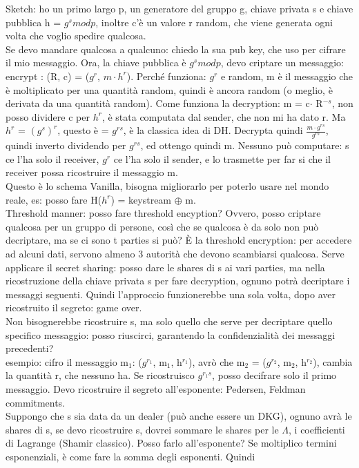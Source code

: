 \documentclass[16px]{article}
\begin{document}
Sketch: ho un primo largo p, un generatore del gruppo g, chiave privata s e chiave pubblica h = $g^smodp$, inoltre c'è un valore r random, che viene generata ogni volta che voglio spedire qualcosa.\\ Se devo mandare qualcosa a qualcuno: chiedo la sua pub key, che uso per cifrare il mio messaggio. Ora, la chiave pubblica è $g^smodp$, devo criptare un messaggio: encrypt : (R, c) = ($g^r$, $m\cdot h^r$). Perché funziona: $g^r$ e random, m è il messaggio che è moltiplicato per una quantità random, quindi è ancora random (o meglio, è derivata da una quantità random). Come funziona la decryption: m = c$\cdot$ R$^{-s}$, non posso dividere c per $h^r$, è stata computata dal sender, che non mi ha dato r. Ma $h^r$ = $(g^s)^r$, questo è = $g^{rs}$, è la classica idea di DH. Decrypta quindi $\frac{m\cdot g^{rs}}{g^{rs}}$, quindi inverto dividendo per $g^{rs}$, ed ottengo quindi m. Nessuno può computare: s ce l'ha solo il receiver, $g^r$ ce l'ha solo il sender, e lo trasmette per far si che il receiver possa ricostruire il messaggio m.\\ Questo è lo schema Vanilla, bisogna migliorarlo per poterlo usare nel mondo reale, es: posso fare H($h^r$) = keystream $\oplus$ m.\\ Threshold manner: posso fare threshold encyption? Ovvero, posso criptare qualcosa per un gruppo di persone, così che se qualcosa è da solo non può decriptare, ma se ci sono t parties si può? È la threshold encryption: per accedere ad alcuni dati, servono almeno 3 autorità che devono scambiarsi qualcosa. Serve applicare il secret sharing: posso dare le shares di s ai vari parties, ma nella ricostruzione della chiave privata s per fare decryption, ognuno potrà decriptare i messaggi seguenti. Quindi l'approccio funzionerebbe una sola volta, dopo aver ricostruito il segreto: game over.\\ Non bisognerebbe ricostruire s, ma solo quello che serve per decriptare quello specifico messaggio: posso riuscirci, garantendo la confidenzialità dei messaggi precedenti?\\ esempio: cifro il messaggio m$_1$: ($g^{r_1}$, m$_1$, h$^{r_1}$), avrò che m$_2$ = ($g^{r_2}$, m$_2$, h$^{r_2}$), cambia la quantità r, che nessuno ha. Se ricostruisco $g^{r_1s}$, posso decifrare solo il primo messaggio. Devo ricostruire il segreto all'esponente: Pedersen, Feldman commitments.\\ Suppongo che s sia data da un dealer (può anche essere un DKG), ognuno avrà le shares di s, se devo ricostruire s, dovrei sommare le shares per le $\Lambda$, i coefficienti di Lagrange (Shamir classico). Posso farlo all'esponente? Se moltiplico termini esponenziali, è come fare la somma degli esponenti. Quindi
\end{document}
